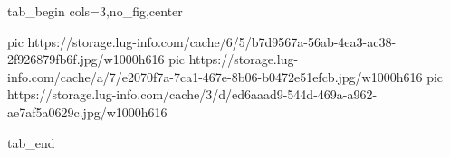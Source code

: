  
 
 
 
 


\ifcmt
  tab_begin cols=3,no_fig,center

     pic https://storage.lug-info.com/cache/6/5/b7d9567a-56ab-4ea3-ac38-2f926879fb6f.jpg/w1000h616
		 pic https://storage.lug-info.com/cache/a/7/e2070f7a-7ca1-467e-8b06-b0472e51efcb.jpg/w1000h616
		 pic https://storage.lug-info.com/cache/3/d/ed6aaad9-544d-469a-a962-ae7af5a0629c.jpg/w1000h616

  tab_end
\fi

